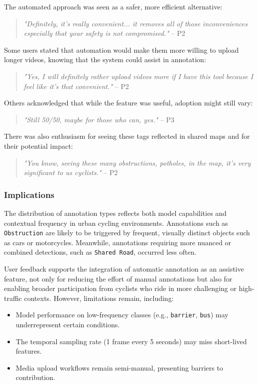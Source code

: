 The automated approach was seen as a safer, more efficient alternative:

\begin{quote}
\textit{"Definitely, it's really convenient... it removes all of those inconveniences especially that your safety is not compromised."} -- P2
\end{quote}

Some users stated that automation would make them more willing to upload longer videos, knowing that the system could assist in annotation:

\begin{quote}
\textit{"Yes, I will definitely rather upload videos more if I have this tool because I feel like it's that convenient."} -- P2
\end{quote}

Others acknowledged that while the feature was useful, adoption might still vary:

\begin{quote}
\textit{"Still 50/50, maybe for those who can, yes."} -- P3
\end{quote}

There was also enthusiasm for seeing these tags reflected in shared maps and for their potential impact:

\begin{quote}
\textit{"You know, seeing these many obstructions, potholes, in the map, it's very significant to us cyclists."} -- P2
\end{quote}

\subsubsection*{Implications}

The distribution of annotation types reflects both model capabilities and contextual frequency in urban cycling environments. Annotations such as \texttt{Obstruction} are likely to be triggered by frequent, visually distinct objects such as cars or motorcycles. Meanwhile, annotations requiring more nuanced or combined detections, such as \texttt{Shared Road}, occurred less often.

User feedback supports the integration of automatic annotation as an assistive feature, not only for reducing the effort of manual annotations but also for enabling broader participation from cyclists who ride in more challenging or high-traffic contexts. However, limitations remain, including:
\begin{itemize}
    \item Model performance on low-frequency classes (e.g., \texttt{barrier}, \texttt{bus}) may underrepresent certain conditions.
    \item The temporal sampling rate (1 frame every 5 seconds) may miss short-lived features.
    \item Media upload workflows remain semi-manual, presenting barriers to contribution.
\end{itemize}

